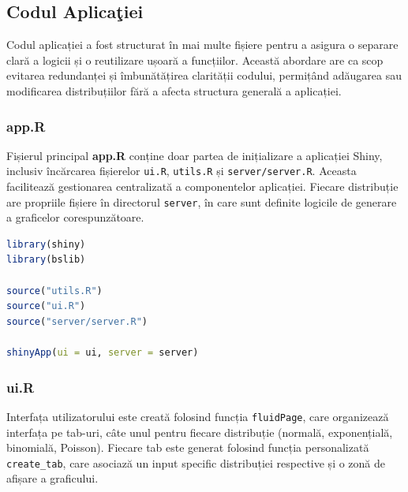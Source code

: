 \documentclass[a4paper,11pt]{article}
\begin{document}
\newpage

\subsection*{Codul Aplica\c{t}iei}

Codul aplicației a fost structurat în mai multe fișiere pentru a asigura o separare clară a logicii și o reutilizare ușoară a funcțiilor. Această abordare are ca scop evitarea redundanței și îmbunătățirea clarității codului, permițând adăugarea sau modificarea distribuțiilor fără a afecta structura generală a aplicației.

\subsubsection*{app.R}

Fișierul principal \textbf{app.R} conține doar partea de inițializare a aplicației Shiny, inclusiv încărcarea fișierelor \texttt{ui.R}, \texttt{utils.R} și \texttt{server/server.R}. Aceasta facilitează gestionarea centralizată a componentelor aplicației.
Fiecare distribuție are propriile fișiere în directorul \texttt{server}, în care sunt definite logicile de generare a graficelor corespunzătoare.

\begin{lstlisting}[language=R, basicstyle=\ttfamily\footnotesize, keywordstyle=\color{blue}\bfseries, commentstyle=\color{green!60!black}, stringstyle=\color{orange}]
library(shiny)
library(bslib)

source("utils.R")
source("ui.R")
source("server/server.R")

shinyApp(ui = ui, server = server)
\end{lstlisting}

\subsubsection*{ui.R}

Interfața utilizatorului este creată folosind funcția \texttt{fluidPage}, care organizează interfața pe tab-uri, câte unul pentru fiecare distribuție (normală, exponențială, binomială, Poisson). Fiecare tab este generat folosind funcția personalizată \texttt{create\_tab}, care asociază un input specific distribuției respective și o zonă de afișare a graficului.
\end{document}
